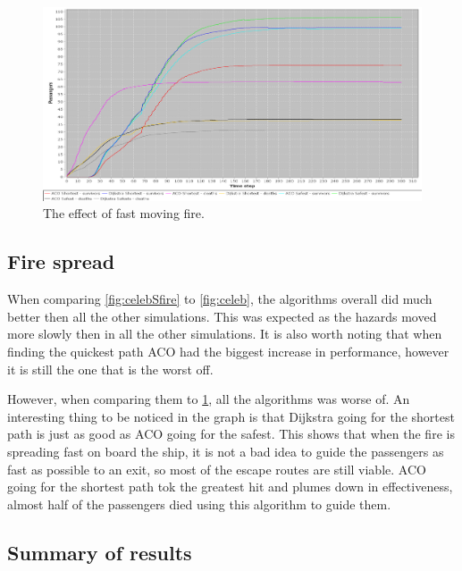\begin{figure} [h]
\centering
\hspace*{-1.0in}
\includegraphics[scale=0.35]{images/Graph-using-200-rounds-140-passangers-and-fast-fire.png}
\caption{The effect of fast moving fire.}
\label{fig:celebFfire}
\end{figure}

\subsection{Fire spread}

When comparing \ref{fig:celebSfire} to \ref{fig:celeb}, the algorithms overall did much better then all the other simulations. This was expected as the hazards moved more slowly then in all the other simulations. It is also worth noting that when finding the quickest path ACO had the biggest increase in performance, however it is still the one that is the worst off.

However, when comparing them to \ref{fig:celebFfire}, all the algorithms was worse of. An interesting thing to be noticed in the graph is that Dijkstra going for the shortest path is just as good as ACO going for the safest. This shows that when the fire is spreading fast on board the ship, it is not a bad idea to guide the passengers as fast as possible to an exit, so most of the escape routes are still viable. ACO going for the shortest path tok the greatest hit and plumes down in effectiveness, almost half of the passengers died using this algorithm to guide them.



\subsection{Summary of results}

